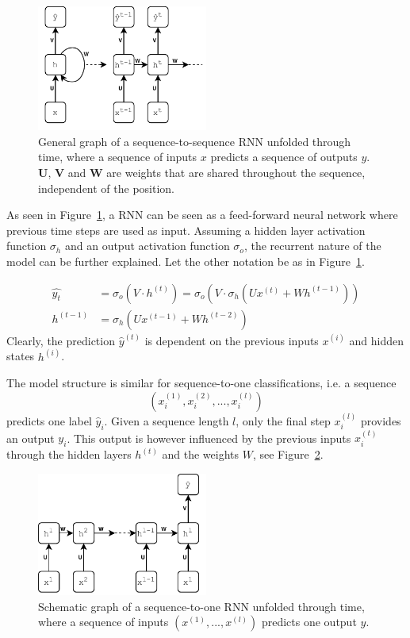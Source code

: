 \begin{figure}[H]
    \centering
    \includegraphics[width=0.5\textwidth]{Figures/figs-simplernn.pdf}
    \caption{General graph of a sequence-to-sequence RNN unfolded through time, where a sequence of inputs $x$ predicts a sequence of outputs $y$. $\mathbf{U}$, $\mathbf{V}$ and $\mathbf{W}$ are weights that are shared throughout the sequence, independent of the position.}
    \label{fig:rnn}
\end{figure}

As seen in Figure~\ref{fig:rnn}, a RNN can be seen as a feed-forward neural network where previous time steps are used as input. Assuming a hidden layer activation function $\sigma_h$ and an output activation function $\sigma_o$, the recurrent nature of the model can be further explained. Let the other notation be as in Figure~\ref{fig:rnn}. 

\begin{align}
    \hat{y_t} &= \sigma_o(V \cdot h^{(t)}) = \sigma_o(V \cdot  \sigma_h(U x^{(t)} + W h^{(t-1)})) \\
    h^{(t-1)} &= \sigma_h(Ux^{(t-1)} + W h^{(t-2)})
\end{align}
Clearly, the prediction $\hat{y}^{(t)}$ is dependent on the previous inputs $x^{(i)}$ and hidden states $h^{(i)}$. 

The model structure is similar for sequence-to-one classifications, i.e. a sequence
\[
(x_i^{(1)}, x_i^{(2)}, ..., x_i^{(l)})
\]
predicts one label $\hat{y}_i$. Given a sequence length $l$, only the final step $x_i^{(l)}$ provides an output $y_i$. This output is however influenced by the previous inputs $x_i^{(t)}$ through the hidden layers $h^{(t)}$ and the weights $W$, see Figure~\ref{fig:rnns2o}. 


\begin{figure}[H]
    \centering
    \includegraphics[width=0.5\textwidth]{Figures/figs-rnn-s2o.pdf}
    \caption{Schematic graph of a sequence-to-one RNN unfolded through time, where a sequence of inputs $(x^{(1)}, ..., x^{(l)})$ predicts one output $y$.}
    \label{fig:rnns2o}
\end{figure}

